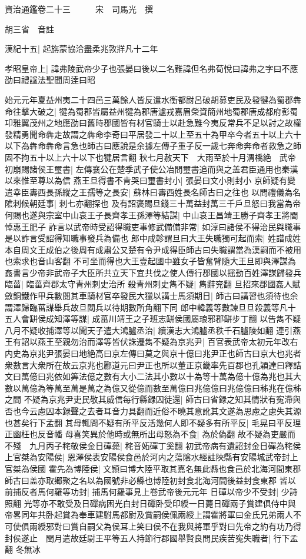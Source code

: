 資治通鑑卷二十三　　　宋　司馬光　撰

胡三省　音註

漢紀十五|{
	起旃蒙協洽盡柔兆敦牂凡十二年}


孝昭皇帝上|{
	諱弗陵武帝少子也張晏曰後以二名難諱但名弗荀悅曰諱弗之字曰不應劭曰禮諡法聖聞周逹曰昭}


始元元年夏益州夷二十四邑三萬餘人皆反遣水衡都尉呂破胡募吏民及發犍為蜀郡犇命往擊大破之|{
	犍為蜀郡皆屬益州犍為郡唐瀘戎嘉眉榮資簡州地蜀郡唐成都府彭蜀卭雅翼茂州之地應劭曰舊時郡國皆有材官騎士以赴急難今夷反常兵不足以討之故權發精勇聞命犇走故謂之犇命李奇曰平居發二十以上至五十為甲卒今者五十以上六十以下為犇命犇命言急也師古曰應說是余據左傳子重子反一歲七奔命奔命者救急之師固不拘五十以上六十以下也犍居言翻}
秋七月赦天下　大雨至於十月渭橋絶　武帝初崩賜諸侯王璽書|{
	左傳襄公在楚季武子使公冶問璽書追而與之盖君臣通用也秦漢以來惟至尊以為信}
燕王旦得書不肯哭曰璽書封小|{
	張晏曰文小則封小}
京師疑有變遣幸臣夀西長孫縱之王孺等之長安|{
	蘇林曰夀西姓長名師古曰之往也}
以問禮儀為名隂刺候朝廷事|{
	刺七亦翻探也}
及有詔褒賜旦錢三十萬益封萬三千戶旦怒曰我當為帝何賜也遂與宗室中山哀王子長齊孝王孫澤等結謀|{
	中山哀王昌靖王勝子齊孝王將閭悼惠王肥子}
詐言以武帝時受詔得職吏事修武備備非常|{
	如淳曰諸侯不得治民與職事是以詐言受詔得知職事發兵為備也}
郎中成軫謂旦曰大王失職獨可起而索|{
	姓譜成姓本自周文王成伯之後周有成肅公又楚有令尹成得臣師古曰失職謂當為漢嗣而不被用也索求也音山客翻}
不可坐而得也大王壹起國中雖女子皆奮臂隨大王旦即與澤謀為姦書言少帝非武帝子大臣所共立天下宜共伐之使人傳行郡國以揺動百姓澤謀歸發兵臨菑|{
	臨菑齊郡太守青州刺史治所}
殺青州刺史雋不疑|{
	雋辭兖翻}
旦招來郡國姦人賦斂銅鐵作甲兵數閱其車騎材官卒發民大獵以講士馬須期日|{
	師古曰講習也須待也余謂澤歸臨菑謀舉兵故旦閲兵以待期數所角翻下同}
郎中韓義等數諫旦旦殺義等凡十五人會缾侯成知澤等謀|{
	成菑川靖王之子班志缾侯國屬琅邪郡缾步丁翻}
以告雋不疑八月不疑收捕澤等以聞天子遣大鴻臚丞治|{
	續漢志大鴻臚丞秩千石臚陵如翻}
連引燕王有詔以燕王至親勿治而澤等皆伏誅遷雋不疑為京兆尹|{
	百官表武帝太初元年改右内史為京兆尹張晏曰地絶高曰京左傳曰莫之與京十億曰兆尹正也師古曰京大也兆者衆數言大衆所在故云京兆也酈道元曰尹正也所以董正京畿率先百郡也孔穎達曰釋詰文曰萬億曰兆依如筭法億之數有大小二法其小數以十為等十萬為億十億為兆也其大數以萬億為等萬至萬是萬之為億又從億而數至萬億曰兆億億曰兆億億曰秭兆在億秭之間}
不疑為京兆尹吏民敬其威信每行縣録囚徒還|{
	師古曰省録之知其情狀有寃滯與否也今云慮囚本録聲之去者耳音力具翻而近俗不曉其意訛其文遂為思慮之慮失其源也甚矣行下孟翻}
其母輒問不疑有所平反活幾何人即不疑多有所平反|{
	毛晃曰平反理正幽枉也反音幡}
母喜笑異於他時或無所出母怒為不食|{
	為於偽翻}
故不疑為吏嚴而不殘　九月丙子秺敬侯金日磾薨|{
	秺音妬磾丁奚翻}
初武帝病有遺詔封金日磾為秺侯上官桀為安陽侯|{
	恩澤侯表安陽侯食邑於河内之蕩隂水經註陜縣有安陽城武帝封上官桀為侯國}
霍先為博陸侯|{
	文頴曰博大陸平取其嘉名無此縣也食邑於北海河間東郡師古曰盖亦取郷聚之名以為國號非必縣也博陸初封食北海河間後益封食東郡}
皆以前捕反者馬何羅等功封|{
	捕馬何羅事見上卷武帝後元元年}
日磾以帝少不受封|{
	少詩照翻}
光等亦不敢受及日磾病困光白封日磾卧受印綬一日薨日磾兩子賞建俱侍中與帝畧同年共卧起賞為奉車建駙馬都尉及賞嗣侯佩兩綬上謂霍將軍曰金氏兄弟兩人不可使俱兩綬邪對曰賞自嗣父為侯耳上笑曰侯不在我與將軍乎對曰先帝之約有功乃得封侯遂止　閏月遣故廷尉王平等五人持節行郡國舉賢良問民疾苦寃失職者|{
	行下孟翻}
冬無冰

